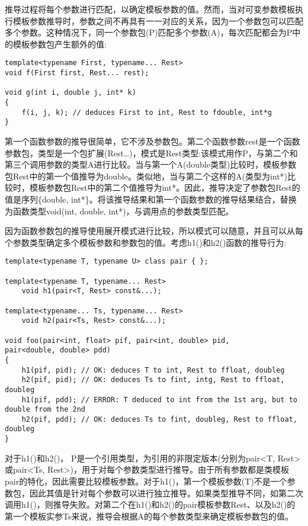 
推导过程将每个参数进行匹配，以确定模板参数的值。然而，当对可变参数模板执行模板参数推导时，参数之间不再具有一一对应的关系，因为一个参数包可以匹配多个参数。这种情况下，同一个参数包(P)匹配多个参数(A)，每次匹配都会为P中的模板参数包产生额外的值:

\begin{lstlisting}[style=styleCXX]
template<typename First, typename... Rest>
void f(First first, Rest... rest);

void g(int i, double j, int* k)
{
	f(i, j, k); // deduces First to int, Rest to fdouble, int*g
}
\end{lstlisting}

第一个函数参数的推导很简单，它不涉及参数包。第二个函数参数rest是一个函数参数包，类型是一个包扩展(Rest…)，模式是Rest类型:该模式用作P，与第二个和第三个调用参数的类型A进行比较。当与第一个A(double类型)比较时，模板参数包Rest中的第一个值推导为double。类似地，当与第二个这样的A(类型为int*)比较时，模板参数包Rest中的第二个值推导为int*。因此，推导决定了参数包Rest的值是序列\{double, int*\}。将该推导结果和第一个函数参数的推导结果结合，替换为函数类型void(int, double, int*)，与调用点的参数类型匹配。

因为函数参数包的推导使用展开模式进行比较，所以模式可以随意，并且可以从每个参数类型确定多个模板参数和参数包的值。考虑h1()和h2()函数的推导行为:

\begin{lstlisting}[style=styleCXX]
template<typename T, typename U> class pair { };

template<typename T, typename... Rest>
	void h1(pair<T, Rest> const&...);

template<typename... Ts, typename... Rest>
	void h2(pair<Ts, Rest> const&...);

void foo(pair<int, float> pif, pair<int, double> pid,
pair<double, double> pdd)
{
	h1(pif, pid); // OK: deduces T to int, Rest to ffloat, doubleg
	h2(pif, pid); // OK: deduces Ts to fint, intg, Rest to ffloat, doubleg
	h1(pif, pdd); // ERROR: T deduced to int from the 1st arg, but to double from the 2nd
	h2(pif, pdd); // OK: deduces Ts to fint, doubleg, Rest to ffloat, doubleg
}
\end{lstlisting}

对于h1()和h2()， P是一个引用类型，为引用的非限定版本(分别为pair<T, Rest>或pair<Ts, Rest>)，用于对每个参数类型进行推导。由于所有参数都是类模板pair的特化，因此需要比较模板参数。对于h1()，第一个模板参数(T)不是一个参数包，因此其值是针对每个参数可以进行独立推导。如果类型推导不同，如第二次调用h1()，则推导失败。对第二个在h1()和h2()的pair模板参数Rest、以及h2()的第一个模板实参Ts来说，推导会根据A的每个参数类型来确定模板参数包的值。

